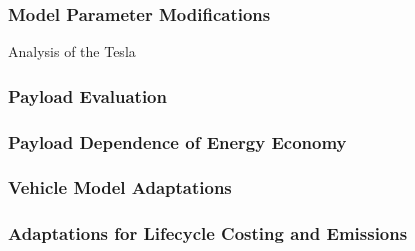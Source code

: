 \subsubsection{Model Parameter Modifications}

Analysis of the Tesla 

\subsubsection{Payload Evaluation}

\subsubsection{Payload Dependence of Energy Economy}

\subsubsection{Vehicle Model Adaptations}

\subsubsection{Adaptations for Lifecycle Costing and Emissions}


